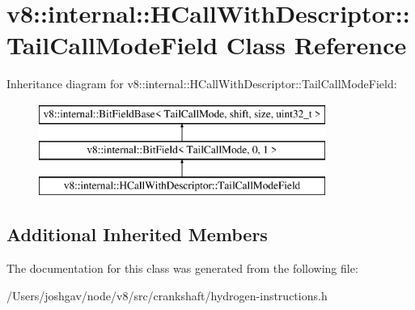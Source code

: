 \hypertarget{classv8_1_1internal_1_1_h_call_with_descriptor_1_1_tail_call_mode_field}{}\section{v8\+:\+:internal\+:\+:H\+Call\+With\+Descriptor\+:\+:Tail\+Call\+Mode\+Field Class Reference}
\label{classv8_1_1internal_1_1_h_call_with_descriptor_1_1_tail_call_mode_field}
Inheritance diagram for v8\+:\+:internal\+:\+:H\+Call\+With\+Descriptor\+:\+:Tail\+Call\+Mode\+Field\+:\begin{figure}[H]
\begin{center}
\leavevmode
\includegraphics[height=3.000000cm]{classv8_1_1internal_1_1_h_call_with_descriptor_1_1_tail_call_mode_field}
\end{center}
\end{figure}
\subsection*{Additional Inherited Members}


The documentation for this class was generated from the following file\+:\begin{DoxyCompactItemize}
\item 
/\+Users/joshgav/node/v8/src/crankshaft/hydrogen-\/instructions.\+h\end{DoxyCompactItemize}
